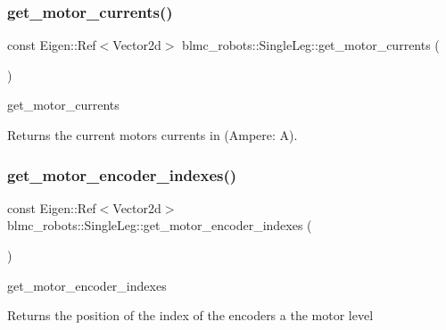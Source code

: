 \subsubsection{\texorpdfstring{get\+\_\+motor\+\_\+currents()}{get\_motor\_currents()}}
{\footnotesize\ttfamily const Eigen\+::\+Ref$<$Vector2d$>$ blmc\+\_\+robots\+::\+Single\+Leg\+::get\+\_\+motor\+\_\+currents (\begin{DoxyParamCaption}{ }\end{DoxyParamCaption})\hspace{0.3cm}{\ttfamily [inline]}}



get\+\_\+motor\+\_\+currents 

\begin{DoxyReturn}{Returns}
the current motors currents in (Ampere\+: A). 
\end{DoxyReturn}
\mbox{\label{classblmc__robots_1_1SingleLeg_aec4353d090ed7bd503d43b3e17671ded}} 
\subsubsection{\texorpdfstring{get\+\_\+motor\+\_\+encoder\+\_\+indexes()}{get\_motor\_encoder\_indexes()}}
{\footnotesize\ttfamily const Eigen\+::\+Ref$<$Vector2d$>$ blmc\+\_\+robots\+::\+Single\+Leg\+::get\+\_\+motor\+\_\+encoder\+\_\+indexes (\begin{DoxyParamCaption}{ }\end{DoxyParamCaption})\hspace{0.3cm}{\ttfamily [inline]}}



get\+\_\+motor\+\_\+encoder\+\_\+indexes 

\begin{DoxyReturn}{Returns}
the position of the index of the encoders a the motor level 
\end{DoxyReturn}
\mbox{\label{classblmc__robots_1_1SingleLeg_a2be0f81bd58416d43614e2c6069ca471}} 
